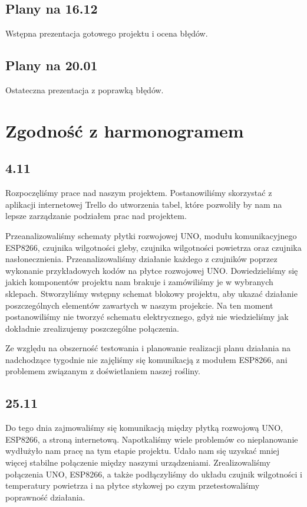 \documentclass[12pt]{article}
\begin{document}
\subsection{Plany na 16.12}
Wstępna prezentacja gotowego projektu i ocena błędów.

\subsection{Plany na 20.01}
Ostateczna prezentacja z poprawką błędów.

\section{Zgodność z harmonogramem}
\subsection{4.11}
Rozpoczęliśmy prace nad naszym projektem. Postanowiliśmy skorzystać z aplikacji internetowej Trello do utworzenia tabel, które pozwoliły by nam na lepsze zarządzanie podziałem prac nad projektem.

Przeanalizowaliśmy schematy płytki rozwojowej UNO, modułu komunikacyjnego ESP8266, czujnika wilgotności gleby, czujnika wilgotności powietrza oraz czujnika nasłonecznienia. Przeanalizowaliśmy działanie każdego z czujników poprzez wykonanie przykładowych kodów na płytce rozwojowej UNO. Dowiedzieliśmy się jakich komponentów projektu nam brakuje i zamówiliśmy je w wybranych sklepach.
Stworzyliśmy wstępny schemat blokowy projektu, aby ukazać działanie poszczególnych elementów zawartych w naszym projekcie. Na ten moment postanowiliśmy nie tworzyć schematu elektrycznego, gdyż nie wiedzieliśmy jak dokładnie zrealizujemy poszczególne połączenia.

Ze względu na obszerność testowania i planowanie realizacji planu działania na nadchodzące tygodnie nie zajęliśmy się komunikacją z modułem ESP8266, ani problemem związanym z doświetlaniem naszej rośliny.


\subsection{25.11}
Do tego dnia zajmowaliśmy się komunikacją między płytką rozwojową UNO, ESP8266, a stroną internetową. Napotkaliśmy wiele problemów co nieplanowanie wydłużyło nam pracę na tym etapie projektu. Udało nam się uzyskać mniej więcej stabilne połączenie między naszymi urządzeniami. Zrealizowaliśmy połączenia UNO, ESP8266, a także podłączyliśmy do układu czujnik wilgotności i temperatury powietrza i na płytce stykowej po czym przetestowaliśmy poprawność działania. 
\end{document}
